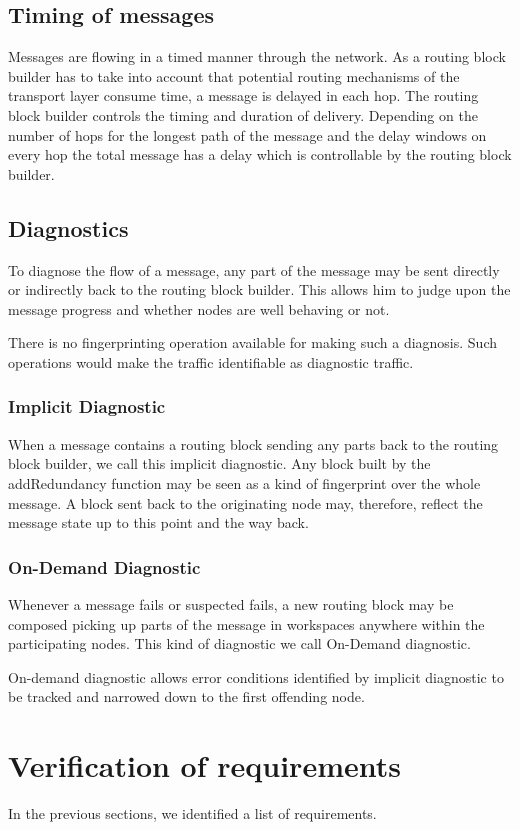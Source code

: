 \subsection{Timing of messages}
Messages are flowing in a timed manner through the network. As a routing block builder has to take into account that potential routing mechanisms of the transport layer consume time, a message is delayed in each hop.  The routing block builder controls the timing and duration of delivery. Depending on the number of hops for the longest path of the message and the delay windows on every hop the total message has a delay which is controllable by the routing block builder.

\subsection{Diagnostics}
To diagnose the flow of a message, any part of the message may be sent directly or indirectly back to the routing block builder. This allows him to judge upon the message progress and whether nodes are well behaving or not.

There is no fingerprinting operation available for making such a diagnosis. Such operations would make the traffic identifiable as diagnostic traffic.

\subsubsection{Implicit Diagnostic}
When a message contains a routing block sending any parts back to the routing block builder, we call this implicit diagnostic. Any block built by the addRedundancy function may be seen as a kind of fingerprint over the whole message. A block sent back to the originating node may, therefore, reflect the message state up to this point and the way back.

\subsubsection{On-Demand Diagnostic}
Whenever a message fails or suspected fails, a new routing block may be composed picking up parts of the message in workspaces anywhere within the participating nodes. This kind of diagnostic we call On-Demand diagnostic.

On-demand diagnostic allows error conditions identified by implicit diagnostic to be tracked and narrowed down to the first offending node.

\section{Verification of requirements}
In the previous sections, we identified a list of requirements.

